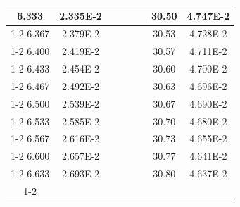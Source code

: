 \documentclass[article,12pt]{elsarticle}
\begin{document}
\begin{longtable}[c]{|c|c|cccccc}
6.333    & 2.335E-2  &                       &                              &                            & \multicolumn{1}{c|}{} & \multicolumn{1}{c|}{30.50}   & \multicolumn{1}{c|}{4.747E-2} \\ \cline{1-2} \cline{7-8} 
6.367    & 2.379E-2  &                       &                              &                            & \multicolumn{1}{c|}{} & \multicolumn{1}{c|}{30.53}   & \multicolumn{1}{c|}{4.728E-2} \\ \cline{1-2} \cline{7-8} 
6.400    & 2.419E-2  &                       &                              &                            & \multicolumn{1}{c|}{} & \multicolumn{1}{c|}{30.57}   & \multicolumn{1}{c|}{4.711E-2} \\ \cline{1-2} \cline{7-8} 
6.433    & 2.454E-2  &                       &                              &                            & \multicolumn{1}{c|}{} & \multicolumn{1}{c|}{30.60}   & \multicolumn{1}{c|}{4.700E-2} \\ \cline{1-2} \cline{7-8} 
6.467    & 2.492E-2  &                       &                              &                            & \multicolumn{1}{c|}{} & \multicolumn{1}{c|}{30.63}   & \multicolumn{1}{c|}{4.696E-2} \\ \cline{1-2} \cline{7-8} 
6.500    & 2.539E-2  &                       &                              &                            & \multicolumn{1}{c|}{} & \multicolumn{1}{c|}{30.67}   & \multicolumn{1}{c|}{4.690E-2} \\ \cline{1-2} \cline{7-8} 
6.533    & 2.585E-2  &                       &                              &                            & \multicolumn{1}{c|}{} & \multicolumn{1}{c|}{30.70}   & \multicolumn{1}{c|}{4.680E-2} \\ \cline{1-2} \cline{7-8} 
6.567    & 2.616E-2  &                       &                              &                            & \multicolumn{1}{c|}{} & \multicolumn{1}{c|}{30.73}   & \multicolumn{1}{c|}{4.655E-2} \\ \cline{1-2} \cline{7-8} 
6.600    & 2.657E-2  &                       &                              &                            & \multicolumn{1}{c|}{} & \multicolumn{1}{c|}{30.77}   & \multicolumn{1}{c|}{4.641E-2} \\ \cline{1-2} \cline{7-8} 
6.633    & 2.693E-2  &                       &                              &                            & \multicolumn{1}{c|}{} & \multicolumn{1}{c|}{30.80}   & \multicolumn{1}{c|}{4.637E-2} \\ \cline{1-2} \cline{7-8} 

\end{longtable}
\end{document}

